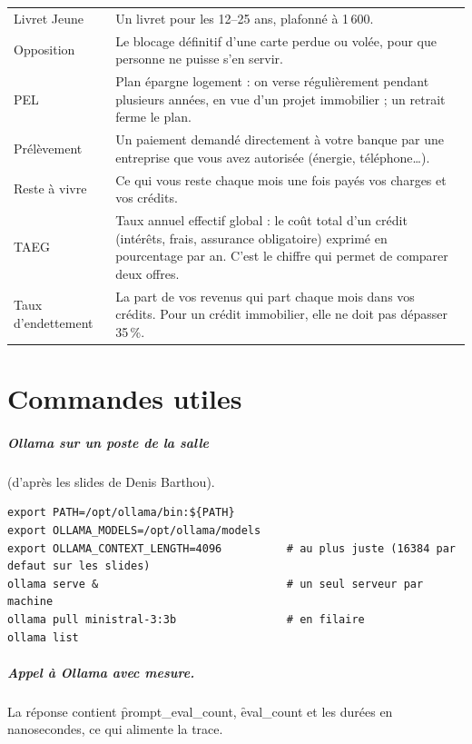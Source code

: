 \begin{center}
\begin{longtable}{@{}L{3.3cm} L{11.1cm}@{}}
Livret Jeune & Un livret pour les 12--25 ans, plafonné à 1\,600\eur{}. \\
Opposition & Le blocage définitif d'une carte perdue ou volée, pour que personne ne puisse s'en
  servir. \\
PEL & Plan épargne logement : on verse régulièrement pendant plusieurs années, en vue d'un projet
  immobilier ; un retrait ferme le plan. \\
Prélèvement & Un paiement demandé directement à votre banque par une entreprise que vous avez
  autorisée (énergie, téléphone\dots). \\
Reste à vivre & Ce qui vous reste chaque mois une fois payés vos charges et vos crédits. \\
TAEG & Taux annuel effectif global : le coût total d'un crédit (intérêts, frais, assurance
  obligatoire) exprimé en pourcentage par an. C'est le chiffre qui permet de comparer deux offres. \\
Taux d'endettement & La part de vos revenus qui part chaque mois dans vos crédits. Pour un crédit
  immobilier, elle ne doit pas dépasser 35\,\%. \\
\bottomrule
\end{longtable}
\end{center}

\chapter{Commandes utiles}
\label{an:commandes}

\paragraph{Ollama sur un poste de la salle} (d'après les slides de Denis Barthou).

\begin{code}
\footnotesize
\begin{verbatim}
export PATH=/opt/ollama/bin:${PATH}
export OLLAMA_MODELS=/opt/ollama/models
export OLLAMA_CONTEXT_LENGTH=4096          # au plus juste (16384 par defaut sur les slides)
ollama serve &                             # un seul serveur par machine
ollama pull ministral-3:3b                 # en filaire
ollama list
\end{verbatim}
\end{code}

\paragraph{Appel à Ollama avec mesure.} La réponse contient \f{prompt\_eval\_count},
\f{eval\_count} et les durées en nanosecondes, ce qui alimente la trace.


